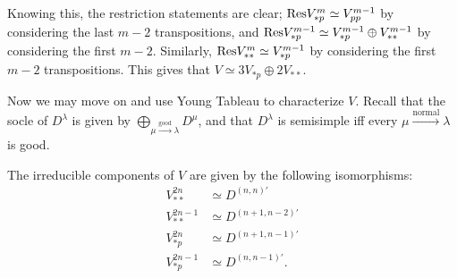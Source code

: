 \documentclass{amsart}
\begin{document}
Knowing this, the restriction statements are clear;
$\text{Res} V_{*p}^m \simeq V_{pp}^{m-1}$ by considering the last $m-2$ transpositions, and $\text{Res} V_{*p}^{m-1} \simeq V_{*p}^{m-1} \oplus V_{**}^{m-1}$ by considering the first $m-2$.
Similarly, $\text{Res} V_{**}^m \simeq V_{*p}^{m-1}$ by considering the first $m-2$ transpositions.
This gives that $V \simeq 3V_{*p} \oplus 2V_{**}$.

Now we may move on and use Young Tableau to characterize $V$.
Recall that the socle of $D^\lambda$ is given by $\bigoplus\limits_{\mu \xrightarrow{\text{good}} \lambda} D^\mu$,  and that $D^\lambda$ is semisimple iff every $\mu \xrightarrow{\text{normal}} \lambda$ is good.
\begin{theorem}
  The irreducible components of $V$ are given by the following isomorphisms:
    \begin{align*} 
      V^{2n}_{**} &\simeq D^{(n,n)'}\\ 
      V^{2n-1}_{**} &\simeq D^{(n+1,n-2)'}\\
      V^{2n}_{*p} &\simeq D^{(n+1,n-1)'}\\
      V^{2n-1}_{*p} &\simeq D^{(n,n-1)'}.
     \end{align*}
\end{theorem}
\end{document}
